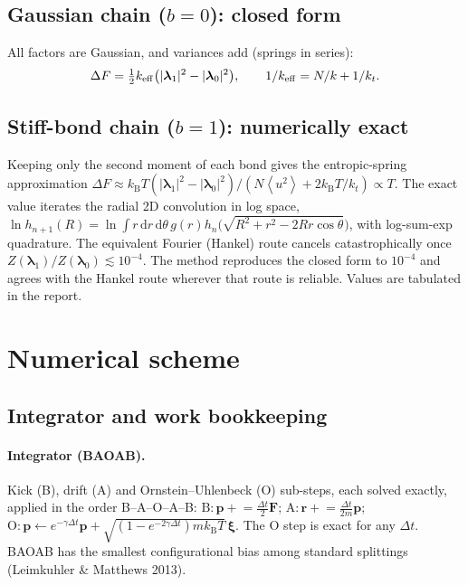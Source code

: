 \documentclass[11pt,a4paper]{article}
\newcommand{\kT}{k_{\mathrm B}T}
\newcommand{\dd}{\mathrm{d}}
\newcommand{\avg}[1]{\left\langle #1\right\rangle}
\newcommand{\lam}{\bm{\lambda}}
\begin{document}
\subsection{Gaussian chain ($b=0$): closed form}
\label{sec:exactA}
All factors are Gaussian, and variances add (springs in series):
\begin{equation}
\Delta F=\tfrac12k_{\rm eff}\big(|\lam_1|^2-|\lam_0|^2\big),\qquad 1/k_{\rm eff}=N/k+1/k_t .
\end{equation}

\subsection{Stiff-bond chain ($b=1$): numerically exact}
\label{sec:exactB}
Keeping only the second moment of each bond gives the entropic-spring approximation
$\Delta F\approx\kT(|\lam_1|^2-|\lam_0|^2)/(N\avg{u^2}+2\kT/k_t)\propto T$. The exact value iterates the
radial 2D convolution in log space,
$\ln h_{n+1}(R)=\ln\int r\,\dd r\,\dd\theta\,g(r)h_n\big(\sqrt{R^2+r^2-2Rr\cos\theta}\big)$, with
log-sum-exp quadrature. The equivalent Fourier (Hankel) route cancels catastrophically once
$Z(\lam_1)/Z(\lam_0)\lesssim10^{-4}$. The method reproduces the closed form to $10^{-4}$ and agrees
with the Hankel route wherever that route is reliable. Values are tabulated in the report.

\section{Numerical scheme}
\label{sec:numerics}

\subsection{Integrator and work bookkeeping}
\paragraph{Integrator (BAOAB).} Kick (B), drift (A) and Ornstein--Uhlenbeck (O) sub-steps, each solved
exactly, applied in the order B--A--O--A--B:
$\text{B}:\bm p\mathrel{+}=\tfrac{\Delta t}{2}\bm F$; $\text{A}:\bm r\mathrel{+}=\tfrac{\Delta t}{2m}\bm p$;
$\text{O}:\bm p\leftarrow e^{-\gamma\Delta t}\bm p+\sqrt{(1-e^{-2\gamma\Delta t})m\kT}\,\bm\xi$. The O step is
exact for any $\Delta t$. BAOAB has the smallest configurational bias among standard splittings
(Leimkuhler \& Matthews 2013).
\end{document}
